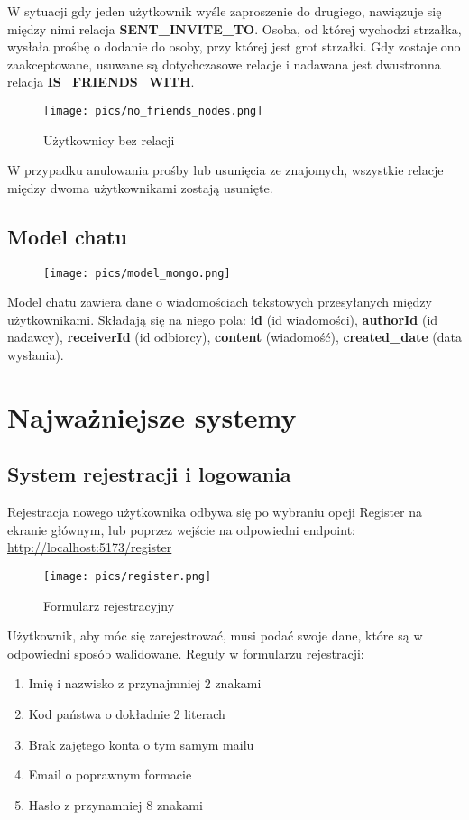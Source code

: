 \documentclass{article}
\begin{document}
W sytuacji gdy jeden użytkownik wyśle zaproszenie do drugiego, nawiązuje się między nimi relacja \textbf{SENT\_INVITE\_TO}. Osoba, od której wychodzi strzałka, wysłała prośbę o dodanie do osoby, przy której jest grot strzałki.
Gdy zostaje ono zaakceptowane, usuwane są dotychczasowe relacje i nadawana jest dwustronna relacja \textbf{IS\_FRIENDS\_WITH}.

\begin{figure}[ht]
    \centering
    \texttt{[image: pics/no\_friends\_nodes.png]}
    \caption*{Użytkownicy bez relacji}
\end{figure}

W przypadku anulowania prośby lub usunięcia ze znajomych, wszystkie relacje między dwoma użytkownikami zostają usunięte.

\subsection{Model chatu}
\begin{figure}[h]
    \centering
    \texttt{[image: pics/model\_mongo.png]}
\end{figure}

Model chatu zawiera dane o wiadomościach tekstowych przesyłanych między użytkownikami. Składają się na niego pola: \textbf{id} (id wiadomości), \textbf{authorId} (id nadawcy), \textbf{receiverId} (id odbiorcy), \textbf{content} (wiadomość), \textbf{created\_date} (data wysłania). 

\newpage
\section{Najważniejsze systemy}
\subsection{System rejestracji i logowania}

Rejestracja nowego użytkownika odbywa się po wybraniu opcji Register na ekranie głównym, lub poprzez wejście na odpowiedni endpoint: \\
\url{http://localhost:5173/register}

\begin{figure}[h]
    \centering
    \texttt{[image: pics/register.png]}
    \caption*{Formularz rejestracyjny}
\end{figure}

Użytkownik, aby móc się zarejestrować, musi podać swoje dane, które są w odpowiedni sposób walidowane. Reguły w formularzu rejestracji:
\begin{enumerate}
    \item Imię i nazwisko z przynajmniej 2 znakami
    \item Kod państwa o dokładnie 2 literach
    \item Brak zajętego konta o tym samym mailu
    \item Email o poprawnym formacie
    \item Hasło z przynamniej 8 znakami
\end{enumerate}
\end{document}
